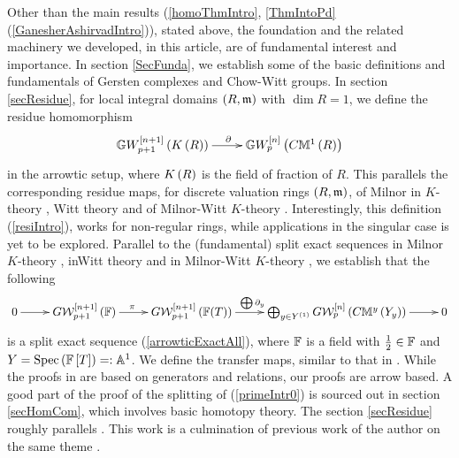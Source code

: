 \documentclass[12pt]{article}
\begin{document}
\eT
%

Other than the main results  (\ref{homoThmIntro}, \ref{ThmIntoPd}(\ref{GanesherAshirvadIntro})), stated above, the  foundation and the related machinery we developed, in this article, are of fundamental interest and importance.   In section \ref{SecFunda}, we establish some of the basic definitions and fundamentals of Gersten complexes and Chow-Witt groups. 
%
 In section \ref{secResidue}, for local integral domains $\left( R, \mathfrak {m}\right)$ with $\dim R=1$, we define
the residue homomorphism 
\begin{equation}\label{resiIntro}
\diagram {\BG}W_{p+1}^{\LRt{n+1}}\LRf{K\LRf{R}}\ar[r]^{\partial} &  {\BG}W_{p}^{\LRt{n}}\LRf{C{\BM}^1\LRf{R}}\\ \enddiagram
\end{equation}
in the arrowtic setup, where $K\left( R\right)$ is the  field of fraction of $R$. This parallels the corresponding residue maps,
for discrete valuation rings $\left( R, \mathfrak {m}\right)$,
of Milnor  in $K$-theory \cite[pp 322]{M69}, Witt theory \cite[pp 334]{M69} and 
of Milnor-Witt $K$-theory \cite[pp 55]{M12}. Interestingly, this definition 
(\ref{resiIntro}), works for non-regular rings, while applications in the singular case is yet to be explored. Parallel to 
the (fundamental) split exact sequences in Milnor $K$-theory \cite[pp 325]{M69} , inWitt theory   \cite[pp 335]{M69} and in
Milnor-Witt $K$-theory \cite[pp 60]{M12}, we establish that the following  
\begin{equation}\label{primeIntr0}
\diagram
0\ar[r] &
{G}{\CW}^{\LRt{n+1}}_{p+1}\LRf{{\BF}} \ar[r]^{\pi\quad} &
{G}{\CW}^{\LRt{n+1}}_{p+1}\LRf{{\BF}(T)} \ar[r]^{\bigoplus \partial_y\qquad }  & \bigoplus_{y\in Y^{\LRf{1}}}
{G}{\CW}^{\LRt{n}}_{p}\LRf{C{\BM}^y\LRf{Y_y}}\ar[r] &0 \\
\enddiagram 
\end{equation}  
is a split exact sequence (\ref{arrowticExactAll}), %
where ${\mathbb{F}}$ is a field with $\frac{1}{2}\in {\mathbb{F}}$ and $Y=\mathrm{Spec}\left({\mathbb{F}}\left[ T\right]\right)=:{\mathbb{A}}^1$.  We define the transfer maps, similar to that in \cite{M69, M12} .
  While the proofs in \cite{M69, M12} are based on generators and relations, our proofs are arrow based. A good
 part of the proof of the splitting of (\ref{primeIntr0}) is sourced out in section  \ref{secHomCom}, which involves  basic homotopy theory. The section 
 \ref{secResidue} roughly parallels \cite[Chap 3]{M12}. This work is a culmination of previous work of the author on the same theme \cite{M25, M25l, M23, M17, M15}. 
 
\end{document}
